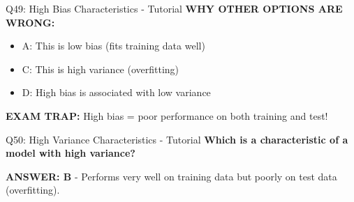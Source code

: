 \documentclass[8pt]{beamer}
\begin{document}
\begin{frame}{Q49: High Bias Characteristics - Tutorial}
		\vspace{0.05cm}
		\textcolor{myred}{\textbf{WHY OTHER OPTIONS ARE WRONG:}}
		\begin{itemize}
			\item \textcolor{myred}{A:} This is low bias (fits training data well)
			\item \textcolor{myred}{C:} This is high variance (overfitting)
			\item \textcolor{myred}{D:} High bias is associated with low variance
		\end{itemize}
		
		\textcolor{myred}{\textbf{EXAM TRAP:}} High bias = poor performance on both training and test!
	\end{frame}
	
	\begin{frame}{Q50: High Variance Characteristics - Tutorial}
		\fontsize{6.5}{7.5}\selectfont
		\textbf{Which is a characteristic of a model with high variance?}
		
		\vspace{0.05cm}
		\textcolor{myblue}{\textbf{ANSWER: B}} - Performs very well on training data but poorly on test data (overfitting).
		

\end{frame}
\end{document}
